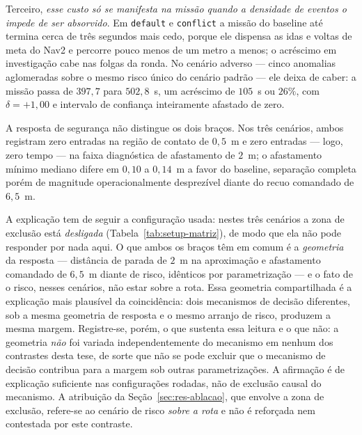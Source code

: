 Terceiro, \emph{esse custo só se manifesta na missão quando a densidade de eventos o
impede de ser absorvido}. Em \texttt{default} e \texttt{conflict} a missão do baseline
até termina cerca de três segundos mais cedo, porque ele dispensa as idas e voltas de
meta do Nav2 e percorre pouco menos de um metro a menos; o acréscimo em investigação
cabe nas folgas da ronda. No cenário adverso --- cinco anomalias aglomeradas sobre o
mesmo risco único do cenário padrão --- ele deixa de caber: a missão passa de $397{,}7$ para $502{,}8$~s, um
acréscimo de $105$~s ou $26\%$, com $\delta=+1{,}00$ e intervalo de confiança
inteiramente afastado de zero.

A resposta de segurança não distingue os dois braços. Nos três cenários, ambos
registram zero entradas na região de contato de $0{,}5$~m e zero entradas --- logo,
zero tempo --- na faixa diagnóstica de afastamento de $2$~m; o afastamento mínimo
mediano difere em $0{,}10$ a $0{,}14$~m a favor do baseline, separação completa porém
de magnitude operacionalmente desprezível diante do recuo comandado de $6{,}5$~m.

A explicação tem de seguir a configuração usada: nestes três cenários a zona de
exclusão está \emph{desligada} (Tabela~\ref{tab:setup-matriz}), de modo que ela não pode
responder por nada aqui. O que ambos os braços têm em comum é a \emph{geometria} da
resposta --- distância de parada de $2$~m na aproximação e afastamento comandado de
$6{,}5$~m diante de risco, idênticos por parametrização --- e o fato de o risco, nesses
cenários, não estar sobre a rota. %
Essa geometria compartilhada é a explicação mais plausível da coincidência: dois
mecanismos de decisão diferentes, sob a mesma geometria de resposta e o mesmo arranjo
de risco, produzem a mesma margem. Registre-se, porém, o que sustenta essa leitura e o
que não: a geometria \emph{não} foi variada independentemente do mecanismo em nenhum
dos contrastes desta tese, de sorte que não se pode excluir que o mecanismo de decisão
contribua para a margem sob outras parametrizações. A afirmação é de explicação
suficiente nas configurações rodadas, não de exclusão causal do mecanismo. A atribuição da
Seção~\ref{sec:res-ablacao}, que envolve a zona de exclusão, refere-se ao cenário de
risco \emph{sobre a rota} e não é reforçada nem contestada por este contraste.

